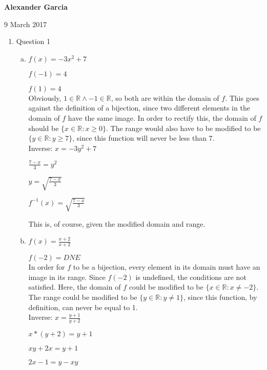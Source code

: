\documentclass[11pt]{article}
\def\AND{\wedge}
\begin{document}
\textbf{Alexander Garcia}

9 March 2017

\begin{enumerate}

	\item Question 1

		\begin{enumerate}[(a)]

			\item $f(x) = -3x^2 + 7$

				$f(-1) = 4$

				$f(1) = 4$ \\

				Obviously, $1 \in \mathbb{R} \AND -1 \in \mathbb{R}$, so both are within
				the domain of $f$. This goes against the definition of a bijection, since
				two different elements in the domain of $f$ have the same image. In order
				to rectify this, the domain of $f$ should be $\{x \in \mathbb{R} : x \geq 0\}$.
				The range would also have to be modified to be $\{y \in \mathbb{R} : y \geq 7\}$,
				since this function will never be less than 7. \\

				Inverse: $x = -3y^2 + 7$

				$\frac{7-x}{3} = y^2$

				$y = \sqrt{\frac{7-x}{3}}$

				$f^{-1}(x) = \sqrt{\frac{7-x}{3}}$

				This is, of course, given the modified domain and range. \\

			\item $f(x) =  \frac{x+2}{x+2}$

				$f(-2) = DNE$ \\

				In order for $f$ to be a bijection, every element in its domain must have
				an image in its range. Since $f(-2)$ is undefined, the conditions are not
				satisfied. Here, the domain of $f$ could be modified to be
				$\{x \in \mathbb{R} : x \neq -2\}$. The range could be modified to be
				$\{y \in \mathbb{R} : y \neq 1\}$, since this function, by definition,
				can never be equal to 1. \\

				Inverse: $x = \frac{y+1}{y+2}$

				$x * (y + 2) = y + 1$

				$xy + 2x = y + 1$

				$2x - 1 = y - xy$


\end{enumerate}
\end{enumerate}
\end{document}
